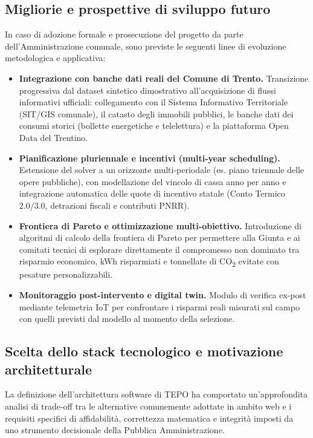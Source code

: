 \subsection*{Migliorie e prospettive di sviluppo futuro}
In caso di adozione formale e prosecuzione del progetto da parte dell'Amministrazione comunale, sono previste le seguenti linee di evoluzione metodologica e applicativa:
\begin{itemize}[leftmargin=1.4em, itemsep=0.25em]
    \item \textbf{Integrazione con banche dati reali del Comune di Trento.} Transizione progressiva dal dataset sintetico dimostrativo all'acquisizione di flussi informativi ufficiali: collegamento con il Sistema Informativo Territoriale (SIT/GIS comunale), il catasto degli immobili pubblici, le banche dati dei consumi storici (bollette energetiche e telelettura) e la piattaforma Open Data del Trentino.
    \item \textbf{Pianificazione pluriennale e incentivi (multi-year scheduling).} Estensione del solver a un orizzonte multi-periodale (es. piano triennale delle opere pubbliche), con modellazione del vincolo di cassa anno per anno e integrazione automatica delle quote di incentivo statale (Conto Termico 2.0/3.0, detrazioni fiscali e contributi PNRR).
    \item \textbf{Frontiera di Pareto e ottimizzazione multi-obiettivo.} Introduzione di algoritmi di calcolo della frontiera di Pareto per permettere alla Giunta e ai comitati tecnici di esplorare direttamente il compromesso non dominato tra risparmio economico, kWh risparmiati e tonnellate di CO\textsubscript{2} evitate con pesature personalizzabili.
    \item \textbf{Monitoraggio post-intervento e digital twin.} Modulo di verifica ex-post mediante telemetria IoT per confrontare i risparmi reali misurati sul campo con quelli previsti dal modello al momento della selezione.
\end{itemize}

\subsection*{Scelta dello stack tecnologico e motivazione architetturale}
La definizione dell'architettura software di TEPO ha comportato un'approfondita analisi di trade-off tra le alternative comunemente adottate in ambito web e i requisiti specifici di affidabilità, correttezza matematica e integrità imposti da uno strumento decisionale della Pubblica Amministrazione.

